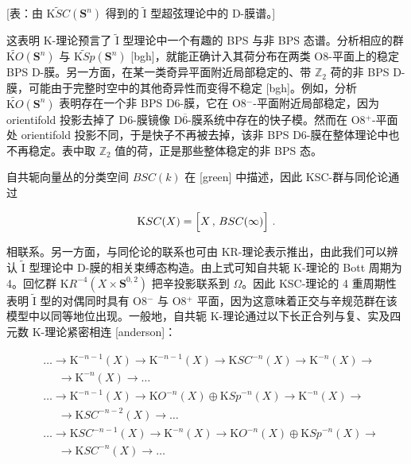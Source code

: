 \documentclass[11pt,a4paper]{ctexart}
\begin{document}
{[}表：由 \(\widetilde{{\mathrm KSC}}({\mathbf S}^n)\) 得到的 \(\widetilde{\mathrm I}\) 型超弦理论中的 D-膜谱。{]}

这表明 K-理论预言了 \(\widetilde{\mathrm I}\) 型理论中一个有趣的 BPS 与非 BPS 态谱。分析相应的群 \(\widetilde{{\mathrm KO}}({\mathbf S}^n)\) 与 \(\widetilde{{\mathrm KSp}}({\mathbf S}^n)\) [bgh]，就能正确计入其荷分布在两类 O8-平面上的稳定 BPS D-膜。另一方面，在某一类奇异平面附近局部稳定的、带 \({\mathbb{Z}}_2\) 荷的非 BPS D-膜，可能由于完整时空中的其他奇异性而变得不稳定 [bgh]。例如，分析 \(\widetilde{{\mathrm KO}}({\mathbf S}^n)\) 表明存在一个非 BPS D6-膜，它在 O8\(^-\)-平面附近局部稳定，因为 orientifold 投影去掉了 D6-膜镜像 D\(\overline{6}\)-膜系统中存在的快子模。然而在 O8\(^+\)-平面处 orientifold 投影不同，于是快子不再被去掉，该非 BPS D6-膜在整体理论中也不再稳定。表中取 \({\mathbb{Z}}_2\) 值的荷，正是那些整体稳定的非 BPS 态。

自共轭向量丛的分类空间 \(BSC(k)\) 在 [green] 中描述，因此 KSC-群与同伦论通过

\[{\mathrm KSC}(X)=\Bigl[X\,,\,BSC(\infty)\Bigr] \ .\]

相联系。另一方面，与同伦论的联系也可由 KR-理论表示推出，由此我们可以辨认 \(\widetilde{\mathrm I}\) 型理论中 D-膜的相关束缚态构造。由上式可知自共轭 K-理论的 Bott 周期为 4。回忆群 \({\mathrm KR}^{-4}(X\times{\mathbf S}^{0,2})\) 把辛投影联系到 \(\Omega\)。因此 KSC-理论的 4 重周期性表明 \(\widetilde{\mathrm I}\) 型的对偶同时具有 O8\(^-\) 与 O8\(^+\) 平面，因为这意味着正交与辛规范群在该模型中以同等地位出现。一般地，自共轭 K-理论通过以下长正合列与复、实及四元数 K-理论紧密相连 [anderson]：

\[\begin{matrix}
&\ldots\longrightarrow
{\mathrm K}^{-n-1}(X)\longrightarrow{\mathrm K}^{-n-1}(X)\longrightarrow{\mathrm KSC}^{-n}(X)
\longrightarrow{\mathrm K}^{-n}(X)\longrightarrow\\
&~~~~~~\longrightarrow{\mathrm K}^{-n}(X)\longrightarrow\ldots\\
&\ldots\longrightarrow{\mathrm K}^{-n-1}(X)\longrightarrow
{\mathrm KO}^{-n}(X)\oplus{\mathrm KSp}^{-n}(X)\longrightarrow{\mathrm K}^{-n}(X)\longrightarrow\\
&~~~~~~\longrightarrow{\mathrm KSC}^{-n-2}(X)\longrightarrow\ldots\\
&\ldots\longrightarrow
{\mathrm KSC}^{-n-1}(X)\longrightarrow{\mathrm K}^{-n}(X)\longrightarrow{\mathrm KO}^{-n}(X)\oplus
{\mathrm KSp}^{-n}(X)\longrightarrow\\
&~~~~~~\longrightarrow{\mathrm KSC}^{-n}(X)\longrightarrow\ldots
\end{matrix}\]
\end{document}
